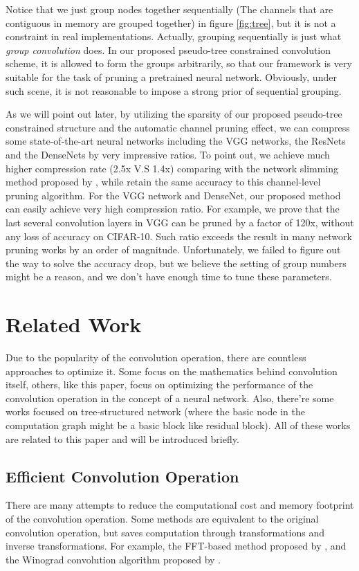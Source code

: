 \documentclass{acmtog} %
\begin{document}
Notice that we just group nodes together sequentially (The channels that are contiguous in memory are grouped together) in figure \ref{fig:tree}, but it is not a constraint in real implementations. Actually, grouping sequentially is just what \emph{group convolution} does. In our proposed pseudo-tree constrained convolution scheme, it is allowed to form the groups arbitrarily, so that our framework is very suitable for the task of pruning a pretrained neural network. Obviously, under such scene, it is not reasonable to impose a strong prior of sequential grouping.

As we will point out later, by utilizing the sparsity of our proposed pseudo-tree constrained structure and the automatic channel pruning effect, we can compress some state-of-the-art neural networks including the VGG networks, the ResNets and the DenseNets by very impressive ratios. To point out, we achieve much higher compression rate (2.5x V.S 1.4x) comparing with the network slimming method proposed by \cite{networkslimming}, while retain the same accuracy to this channel-level pruning algorithm. For the VGG network and DenseNet, our proposed method can easily achieve very high compression ratio. For example, we prove that the last several convolution layers in VGG can be pruned by a factor of 120x, without any loss of accuracy on CIFAR-10. Such ratio exceeds the result in many network pruning works by an order of magnitude. Unfortunately, we failed to figure out the way to solve the accuracy drop, but we believe the setting of group numbers might be a reason, and we don't have enough time to tune these parameters.
\section{Related Work}
Due to the popularity of the convolution operation, there are countless approaches to optimize it. Some focus on the mathematics behind convolution itself, others, like this paper, focus on optimizing the performance of the convolution operation in the concept of a neural network. Also, there're some works focused on tree-structured network (where the basic node in the computation graph might be a basic block like residual block). All of these works are related to this paper and will be introduced briefly.
\subsection{Efficient Convolution Operation}
There are many attempts to reduce the computational cost and memory footprint of the convolution operation. Some methods are equivalent to the original convolution operation, but saves computation through transformations and inverse transformations. For example, the FFT-based method proposed by \cite{FFT}, and the Winograd convolution algorithm proposed by \cite{winograd}.
\end{document}
